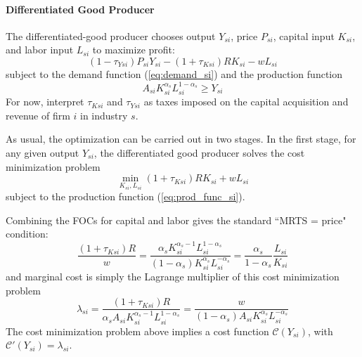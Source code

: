 \documentclass[12pt]{article}
\begin{document}
	\paragraph{Differentiated Good Producer \\ [6pt]}
		The differentiated-good producer chooses output $Y_{si}$, price $P_{si}$, capital input $K_{si}$, and labor input $L_{si}$ to maximize profit:
	\[(1-\tau_{Ysi})P_{si} Y_{si} - (1+\tau_{Ksi})R K_{si} - wL_{si}\]
	subject to the demand function (\ref{eq:demand_si}) and the production function
	\begin{equation} \label{eq:prod_func_si}
		A_{si} K_{si}^{\alpha_s} L_{si}^{1-\alpha_s} \geq Y_{si}
	\end{equation} 
For now, interpret $\tau_{Ksi}$ and $\tau_{Ysi}$ as taxes imposed on the capital acquisition and revenue of firm $i$ in industry $s$.  
	
	As usual, the optimization can be carried out in two stages. In the first stage, for any given output $Y_{si}$, the differentiated good producer solves the cost minimization problem
	\[\min_{K_{si},L_{si}} (1+\tau_{Ksi}) RK_{si} + wL_{si}\]
	subject to the production function (\ref{eq:prod_func_si}).
	
		Combining the FOCs for capital and labor gives the standard ``MRTS = price" condition:
	\begin{equation} \label{eq:FOC_KL}
		\frac{(1+\tau_{Ksi}) R}{w} = \frac{\alpha_s K_{si}^{\alpha_s-1}L_{si}^{1-\alpha_s}}{(1-\alpha_s) K_{si}^{\alpha_s}L_{si}^{-\alpha_s}} = \frac{\alpha_s}{1-\alpha_s} \frac{L_{si}}{K_{si}}
	\end{equation}
	and marginal cost is simply the Lagrange multiplier of this cost minimization problem
	\begin{equation}
		\lambda_{si} = \frac{(1+\tau_{Ksi})R}{\alpha_s A_{si}K_{si}^{\alpha_s-1}L_{si}^{1-\alpha_s}} = \frac{w}{(1-\alpha_s) A_{si}K_{si}^{\alpha_s}L_{si}^{-\alpha_s}}
	\end{equation}
The cost minimization problem above implies a cost function $\mathcal{C}(Y_{si})$, with $\mathcal{C}'(Y_{si}) = \lambda_{si}$.
\end{document}
